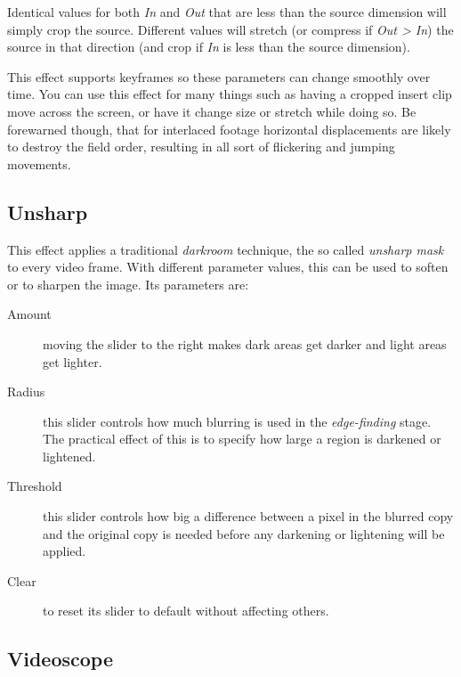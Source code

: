 Identical values for both \textit{In} and \textit{Out} that are less than the source dimension will simply crop the source. Different values will stretch (or compress if \textit{Out > In}) the source in that direction (and crop if \textit{In} is less than the source dimension).

This effect supports keyframes so these parameters can change smoothly over time. You can use this effect for many things such as having a cropped insert clip move across the screen, or have it change size or stretch while doing so. Be forewarned though, that for interlaced footage horizontal displacements are likely to destroy the field order, resulting in all sort of flickering and jumping movements.

\subsection{Unsharp}%
\label{sub:Unsharp}

This effect applies a traditional \textit{darkroom} technique, the so called \textit{unsharp mask} to every video frame. With different parameter values, this can be used to soften or to sharpen the image. Its parameters are:

\begin{description}
    \item[Amount] moving the slider to the right makes dark areas get darker and light areas get lighter.
    \item[Radius] this slider controls how much blurring is used in the \textit{edge-finding} stage. The practical effect of this is to specify how large a region is darkened or lightened.
    \item[Threshold] this slider controls how big a difference between a pixel in the blurred copy and the original copy is needed before any darkening or lightening will be applied.
    \item[Clear] to reset its slider to default without affecting others.
\end{description}

\subsection{Videoscope}%
\label{sub:videoscope}

